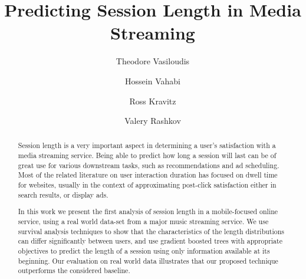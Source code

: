 \documentclass[sigconf]{acmart}
\begin{document}


\title{Predicting Session Length in Media Streaming}


\author{Theodore Vasiloudis}

\author{Hossein Vahabi}

\author{Ross Kravitz}

\author{Valery Rashkov}

\renewcommand{\shortauthors}{T. Vasiloudis et al.}

\begin{abstract}
	Session length is a very important aspect
	in determining a user's satisfaction with a media streaming service. Being able
	to predict how long a session will last can be of great use
	for various downstream tasks, such as recommendations and ad scheduling.
	Most of the related literature on user interaction duration has focused on dwell time for websites,
	usually in the context of approximating post-click satisfaction
	either in search results, or display ads.
	
	In this work we present the first analysis of session length in a
	mobile-focused online service, using a real world data-set from a major music streaming service.
	We use survival analysis techniques to show that the characteristics of the length distributions
	can differ significantly between users, and use gradient boosted trees with appropriate objectives
	to predict the length of a session using only information available at its
	beginning.
	Our evaluation on real world data illustrates that our proposed technique outperforms the considered baseline.

\end{abstract}
\end{document}
